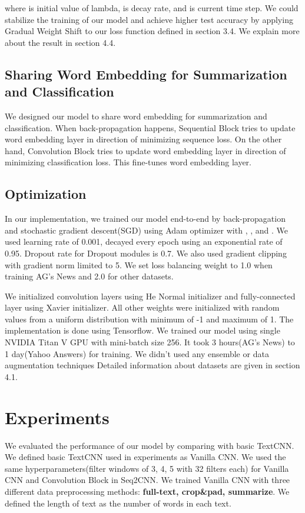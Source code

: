 \documentclass{article}
\begin{document}
where  is initial value of lambda,  is decay rate, and  is current time step. We could stabilize the training of our model and achieve higher test accuracy by applying Gradual Weight Shift to our loss function defined in section 3.4. We explain more about the result in section 4.4. 

\subsection{Sharing Word Embedding for Summarization and Classification}
We designed our model to share word embedding for summarization and classification. When back-propagation happens, Sequential Block tries to update word embedding layer in direction of minimizing sequence loss. On the other hand, Convolution Block tries to update word embedding layer in direction of minimizing classification loss. This fine-tunes word embedding layer. 

\subsection{Optimization}
In our implementation, we trained our model end-to-end by back-propagation and stochastic gradient descent(SGD)\cite{SGD} using Adam optimizer\cite{DBLP:journals/corr/KingmaB14} with , , and . We used learning rate of 0.001, decayed every epoch using an exponential rate of 0.95. Dropout rate for Dropout\cite{JMLR:v15:srivastava14a} modules is 0.7. We also used gradient clipping\cite{DBLP:journals/corr/abs-1211-5063} with gradient norm limited to 5. We set loss balancing weight  to 1.0 when training AG's News and 2.0 for other datasets.

We initialized convolution layers using He Normal\cite{DBLP:journals/corr/HeZR015} initializer and fully-connected layer using Xavier\cite{pmlr-v9-glorot10a} initializer. All other weights were initialized with random values from a uniform distribution with minimum of -1 and maximum of 1. The implementation is done using Tensorflow\cite{tensorflow2015-whitepaper}. We trained our model using single NVIDIA Titan V GPU with mini-batch size 256. It took 3 hours(AG’s News) to 1 day(Yahoo Answers) for training. We didn't used any ensemble or data augmentation techniques Detailed information about datasets are given in section 4.1.

\section{Experiments}
We evaluated the performance of our model by comparing with basic TextCNN\cite{DBLP:journals/corr/Kim14f}. We defined basic TextCNN used in experiments as Vanilla CNN. We used the same hyperparameters(filter windows of 3, 4, 5 with 32 filters each) for Vanilla CNN and Convolution Block in Seq2CNN. We trained Vanilla CNN with three different data preprocessing methods: \textbf{full-text, crop\&pad, summarize}. We defined the length of text as the number of words in each text. 
\end{document}
